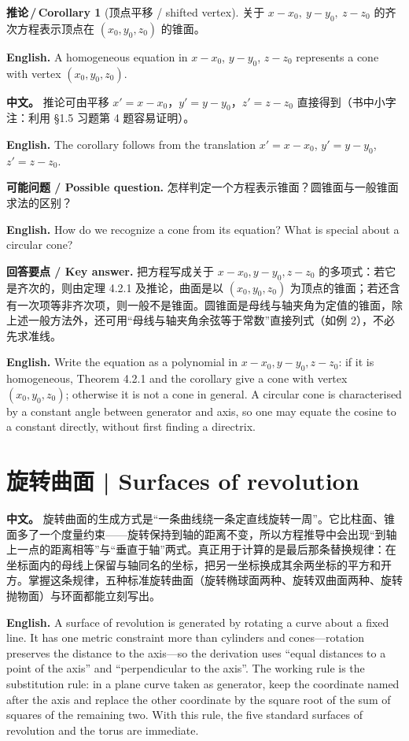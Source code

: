 \documentclass[UTF8,11pt,a4paper]{ctexart}
\newcommand{\APS}[2]{\par\noindent\textbf{中文。} #1\par\noindent\textbf{English.} #2\par\smallskip}
\newcommand{\EN}[1]{\par\noindent \textbf{English.} #1\par}
\newcommand{\ASK}[4]{\par\noindent \textbf{可能问题 / Possible question.} #1\par\EN{#2}\noindent \textbf{回答要点 / Key answer.} #3\par\EN{#4}\medskip}
\theoremstyle{definition}
\newtheorem*{corollary}{推论\,/\,Corollary}
\begin{document}
\begin{corollary}[顶点平移 / shifted vertex]\label{cor:coneshift}
关于 $x-x_0,\ y-y_0,\ z-z_0$ 的齐次方程表示顶点在 $(x_0,y_0,z_0)$ 的锥面。
\EN{A homogeneous equation in $x-x_0$, $y-y_0$, $z-z_0$ represents a cone with vertex $(x_0,y_0,z_0)$.}
\end{corollary}

\APS{推论可由平移 $x'=x-x_0$，$y'=y-y_0$，$z'=z-z_0$ 直接得到（书中小字注：利用 §1.5 习题第 4 题容易证明）。}{The corollary follows from the translation $x'=x-x_0$, $y'=y-y_0$, $z'=z-z_0$.}

\ASK{怎样判定一个方程表示锥面？圆锥面与一般锥面求法的区别？}{How do we recognize a cone from its equation? What is special about a circular cone?}{把方程写成关于 $x-x_0,y-y_0,z-z_0$ 的多项式：若它是齐次的，则由定理 4.2.1 及推论，曲面是以 $(x_0,y_0,z_0)$ 为顶点的锥面；若还含有一次项等非齐次项，则一般不是锥面。圆锥面是母线与轴夹角为定值的锥面，除上述一般方法外，还可用``母线与轴夹角余弦等于常数''直接列式（如例 2），不必先求准线。}{Write the equation as a polynomial in $x-x_0,y-y_0,z-z_0$: if it is homogeneous, Theorem 4.2.1 and the corollary give a cone with vertex $(x_0,y_0,z_0)$; otherwise it is not a cone in general. A circular cone is characterised by a constant angle between generator and axis, so one may equate the cosine to a constant directly, without first finding a directrix.}

\section{\label{sec:3}旋转曲面 | Surfaces of revolution}
\APS{旋转曲面的生成方式是``一条曲线绕一条定直线旋转一周''。它比柱面、锥面多了一个度量约束——旋转保持到轴的距离不变，所以方程推导中会出现``到轴上一点的距离相等''与``垂直于轴''两式。真正用于计算的是最后那条替换规律：在坐标面内的母线上保留与轴同名的坐标，把另一坐标换成其余两坐标的平方和开方。掌握这条规律，五种标准旋转曲面（旋转椭球面两种、旋转双曲面两种、旋转抛物面）与环面都能立刻写出。}{A surface of revolution is generated by rotating a curve about a fixed line. It has one metric constraint more than cylinders and cones---rotation preserves the distance to the axis---so the derivation uses ``equal distances to a point of the axis'' and ``perpendicular to the axis''. The working rule is the substitution rule: in a plane curve taken as generator, keep the coordinate named after the axis and replace the other coordinate by the square root of the sum of squares of the remaining two. With this rule, the five standard surfaces of revolution and the torus are immediate.}
\end{document}
